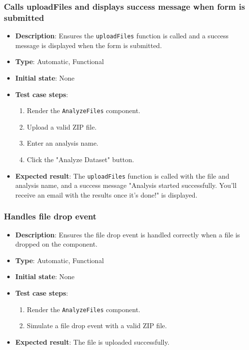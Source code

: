 \documentclass[12pt, titlepage]{article}
\begin{document}
\subsubsection{Calls uploadFiles and displays success message when form is submitted}
\begin{itemize}
    \item \textbf{Description}: Ensures the \texttt{uploadFiles} function is called and a success message is displayed when the form is submitted.
    \item \textbf{Type}: Automatic, Functional
    \item \textbf{Initial state}: None
    \item \textbf{Test case steps}:
    \begin{enumerate}
        \item Render the \texttt{AnalyzeFiles} component.
        \item Upload a valid ZIP file.
        \item Enter an analysis name.
        \item Click the "Analyze Dataset" button.
    \end{enumerate}
    \item \textbf{Expected result}: The \texttt{uploadFiles} function is called with the file and analysis name, and a success message "Analysis started successfully. You'll receive an email with the results once it's done!" is displayed.
\end{itemize}

\subsubsection{Handles file drop event}
\begin{itemize}
    \item \textbf{Description}: Ensures the file drop event is handled correctly when a file is dropped on the component.
    \item \textbf{Type}: Automatic, Functional
    \item \textbf{Initial state}: None
    \item \textbf{Test case steps}:
    \begin{enumerate}
        \item Render the \texttt{AnalyzeFiles} component.
        \item Simulate a file drop event with a valid ZIP file.
    \end{enumerate}
    \item \textbf{Expected result}: The file is uploaded successfully.
\end{itemize}
\end{document}
